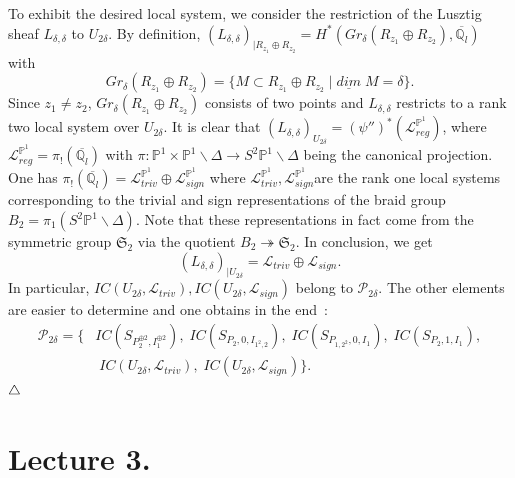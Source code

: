 \documentclass[a4paper,10pt]{amsart}
\def\endexample{$\hfill \triangle$}
\def\endexample{$\hfill \triangle$}
\def\tto{\twoheadrightarrow}
\def\qlb{\overline{\mathbb{Q}_l}}
\numberwithin{equation}{section}
\begin{document}
To exhibit the desired local system, we consider the restriction of the Lusztig sheaf $L_{\delta,\delta}$ to $U_{2\delta}$. By definition, $(L_{\delta,\delta})_{| R_{z_1} \oplus R_{z_2}} =H^*(Gr_{\delta}(R_{z_1} \oplus R_{z_2}),\qlb)$ with
$$Gr_{\delta}(R_{z_1} \oplus R_{z_2})=\big\{ M \subset R_{z_1} \oplus R_{z_2}\;|\; \underline{dim}\;M=\delta \big\}.$$
Since $z_1 \neq z_2$, $Gr_{\delta}(R_{z_1} \oplus R_{z_2})$ consists of two points and $L_{\delta,\delta}$ restricts to a rank two local system over $U_{2\delta}$. It is clear that $(L_{\delta,\delta})_{U_{2\delta}}=(\psi'')^*(\mathcal{L}^{\mathbb{P}^1}_{reg})$, where $\mathcal{L}^{\mathbb{P}^1}_{reg}=\pi_!(\qlb)$ with $\pi: \mathbb{P}^1 \times \mathbb{P}^1 \backslash \Delta \to S^2\mathbb{P}^1 \backslash \Delta$ being the canonical projection. One has
$\pi_!(\qlb)=\mathcal{L}^{\mathbb{P}^1}_{triv} \oplus \mathcal{L}^{\mathbb{P}^1}_{sign}$ where $\mathcal{L}^{\mathbb{P}^1}_{triv} , \mathcal{L}^{\mathbb{P}^1}_{sign}$are the rank one local systems corresponding to the trivial and sign representations of the braid group $B_2=\pi_1(S^2\mathbb{P}^1 \backslash \Delta)$. Note that these representations in fact come from the symmetric group $\mathfrak{S}_2$ via the quotient $B_2 \tto \mathfrak{S}_2$. In conclusion, we get
$$(L_{\delta,\delta})_{|U_{2\delta}} =\mathcal{L}_{triv} \oplus \mathcal{L}_{sign}.$$
In particular, $IC(U_{2\delta}, \mathcal{L}_{triv}), IC(U_{2\delta},\mathcal{L}_{sign})$ belong to $\mathcal{P}_{2\delta}$. The other elements are easier to determine and one obtains in the end~:
\begin{equation}
\begin{split}
\mathcal{P}_{2\delta}=\big\{ &IC(S_{P_2^{\oplus 2}, I_1^{\oplus 2}}), \; IC(S_{P_{2}, 0, I_{1^2,2}}),\; IC(S_{P_{1,2^2}, 0, I_{1}}),\; IC(S_{P_2, 1, I_{ 1}}),\\
&\;IC(U_{2\delta}, \mathcal{L}_{triv}), \;IC(U_{2\delta},\mathcal{L}_{sign})
\big\}.
\end{split}
\end{equation}
\endexample

\vspace{.2in}

\newpage

\section{Lecture 3.}

\setcounter{section}{3}
\setcounter{theo}{0}
\setcounter{equation}{0}
\end{document}
